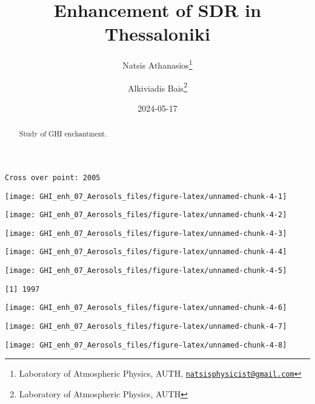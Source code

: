 \documentclass[
  10pt,
  a4paper,oneside]{article}
\title{Enhancement of SDR in Thessaloniki}
\author{Natsis Athanasios\footnote{Laboratory of Atmospheric Physics, AUTH, \href{mailto:natsisphysicist@gmail.com}{\nolinkurl{natsisphysicist@gmail.com}}} \and Alkiviadis Bais\footnote{Laboratory of Atmospheric Physics, AUTH}}
\date{2024-05-17}
\begin{document}
\maketitle
\begin{abstract}
Study of GHI enchantment.
\end{abstract}

{
\hypersetup{linkcolor=}
\setcounter{tocdepth}{4}
\tableofcontents
}
\begin{verbatim}
Cross over point: 2005 
\end{verbatim}

\begin{center}\texttt{[image: GHI\_enh\_07\_Aerosols\_files/figure-latex/unnamed-chunk-4-1]} \end{center}

\begin{center}\texttt{[image: GHI\_enh\_07\_Aerosols\_files/figure-latex/unnamed-chunk-4-2]} \end{center}

\begin{center}\texttt{[image: GHI\_enh\_07\_Aerosols\_files/figure-latex/unnamed-chunk-4-3]} \end{center}

\begin{center}\texttt{[image: GHI\_enh\_07\_Aerosols\_files/figure-latex/unnamed-chunk-4-4]} \end{center}

\begin{center}\texttt{[image: GHI\_enh\_07\_Aerosols\_files/figure-latex/unnamed-chunk-4-5]} \end{center}

\begin{verbatim}
[1] 1997
\end{verbatim}

\begin{center}\texttt{[image: GHI\_enh\_07\_Aerosols\_files/figure-latex/unnamed-chunk-4-6]} \end{center}

\begin{center}\texttt{[image: GHI\_enh\_07\_Aerosols\_files/figure-latex/unnamed-chunk-4-7]} \end{center}

\begin{center}\texttt{[image: GHI\_enh\_07\_Aerosols\_files/figure-latex/unnamed-chunk-4-8]} \end{center}
\end{document}
